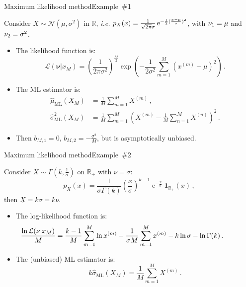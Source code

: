 \documentclass{beamer}
\newcommand{\Rset}{\mathbb{R}}
\newcommand{\iexp}{\operatorname{e}}
\newcommand{\xgj}{x}
\newcommand{\demi}{\frac{1}{2}}
\newcommand{\mean}[1]{\underline{#1}}
\newcommand{\Xgj}{X}
\newcommand{\paraj}{\nu}
\newcommand{\parag}{{\boldsymbol\paraj}}
\newcommand{\biaj}{b}
\newcommand{\likelihood}{{\mathcal L}}
\newcommand{\indic}[1]{{\mathbf 1}_{#1}}
\newcommand{\PDFN}{{\mathcal N}}
\begin{document}
\begin{frame}{Maximum likelihood method}{Example~\#1}

Consider $\Xgj\sim\PDFN(\mu,\sigma^2)$ in $\Rset$, \emph{i.e.} $\smash{p_\Xgj(\xgj)}=\smash{\frac{1}{\sqrt{2\pi}\sigma}\iexp^{-\demi(\frac{\xgj-\mu}{\sigma})^2}}$, with $\smash{\paraj_1}=\mu$ and $\smash{\paraj_2}=\smash{\sigma^2}$.
\begin{itemize}
\item The likelihood function is:
\begin{displaymath}
\likelihood(\parag|\xgj_M)=\left(\frac{1}{2\pi\sigma^2}\right)^{\frac{M}{2}}\exp\left(-\frac{1}{2\sigma^2}\sum_{m=1}^M\left(\xgj^{(m)}-\mu\right)^2\right)\,.
\end{displaymath}
\item The ML estimator is:
\begin{displaymath}
\begin{split}
\hat{\mu}_{\text{ML}}(\Xgj_M) &=\frac{1}{M}\sum_{m=1}^M\Xgj^{(m)}\,,\\
\hat{\sigma}^2_{\text{ML}}(\Xgj_M) &=\frac{1}{M}\sum_{m=1}^M\left(\Xgj^{(m)}-\frac{1}{M}\sum_{n=1}^M\Xgj^{(n)}\right)^2\,.
\end{split}
\end{displaymath}
\item Then $\biaj_{M,1}=0$, $\biaj_{M,2}=-\frac{\sigma^2}{M}$, but is asymptotically unbiased.
\end{itemize}

\end{frame}

\begin{frame}{Maximum likelihood method}{Example~\#2}

Consider $\Xgj\sim\Gamma(k,\frac{1}{\sigma})$ on $\Rset_+$ with $\paraj=\sigma$:
\begin{displaymath}
p_\Xgj(\xgj)=\frac{1}{\sigma\Gamma(k)}\left(\frac{\xgj}{\sigma}\right)^{k-1}\iexp^{-\frac{\xgj}{\sigma}}\indic{\Rset_+}(\xgj)\,,
\end{displaymath}
then $\mean{\Xgj}=k\sigma=k\nu$.
\begin{itemize}
\item The log-likelihood function is:
\begin{multline*}
\hspace*{-1.3truecm}\frac{\ln\likelihood(\paraj|\xgj_M)}{M}=\frac{k-1}{M}\sum_{m=1}^M\ln\xgj^{(m)}-\frac{1}{\sigma M}\sum_{m=1}^M\xgj^{(m)}-k\ln\sigma-\ln\Gamma(k)\,.
\end{multline*}
\item The (unbiased) ML estimator is:
\begin{displaymath}
k\hat{\sigma}_{\text{ML}}(\Xgj_M)=\frac{1}{M}\sum_{m=1}^M\Xgj^{(m)}\,.
\end{displaymath}
\end{itemize}

\end{frame}
\end{document}
